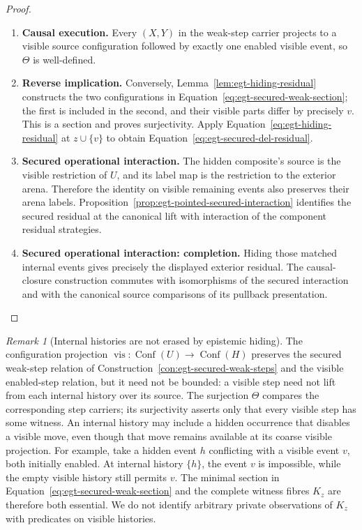 \documentclass[11pt,a4paper]{article}
\numberwithin{equation}{section}
\theoremstyle{definition}
\theoremstyle{remark}
\newtheorem{remark}[theorem]{Remark}
\theoremstyle{plain}
\begin{document}
\begin{proof}
\leavevmode
\begin{enumerate}[label=\textup{(\arabic*)},leftmargin=*,itemsep=4pt,topsep=3pt]
  \item \textbf{Causal execution.} Every $(X,Y)$ in the weak-step carrier projects to a visible source
configuration followed by exactly one enabled visible event, so $\Theta$
is well-defined.
  \item \textbf{Reverse implication.} Conversely, Lemma~\ref{lem:egt-hiding-residual}
constructs the two configurations in
Equation~\eqref{eq:egt-secured-weak-section}; the first is included in
the second, and their visible parts differ by precisely $v$. This is a
section and proves surjectivity. Apply
Equation~\eqref{eq:egt-hiding-residual} at $z\cup\{v\}$ to obtain
Equation~\eqref{eq:egt-secured-del-residual}.
  \item \textbf{Secured operational interaction.} The hidden composite's
source is the visible restriction of $U$, and its label map is the
restriction to the exterior arena. Therefore the identity on visible
remaining events also preserves their arena labels. Proposition~\ref{prop:egt-pointed-secured-interaction} identifies the
secured residual at the canonical lift with interaction of the
component residual strategies.
  \item \textbf{Secured operational interaction: completion.} Hiding those matched internal events
gives precisely the displayed exterior residual. The causal-closure
construction commutes with isomorphisms of the secured interaction and
with the canonical source comparisons of its pullback presentation.
\end{enumerate}
\end{proof}


\begin{remark}[Internal histories are not erased by epistemic hiding]
\label{rem:egt-hidden-epistemic-witnesses}
The configuration projection
$\operatorname{vis}:\operatorname{Conf}(U)\to\operatorname{Conf}(H)$
preserves the secured weak-step relation of
Construction~\ref{con:egt-secured-weak-steps} and the visible enabled-step
relation, but it need not be bounded: a visible step need not lift from
each internal history over its source. The surjection $\Theta$ compares
the corresponding step carriers; its surjectivity asserts only that every
visible step has some witness. An internal history may include a hidden
occurrence that disables a visible
move, even though that move remains available at its coarse visible
projection. For example, take a hidden event $h$ conflicting with a
visible event $v$, both initially enabled. At internal history $\{h\}$,
the event $v$ is impossible, while the empty visible history still permits
$v$. The minimal section in
Equation~\eqref{eq:egt-secured-weak-section} and the complete witness
fibres $K_z$ are therefore both essential. We do not identify arbitrary
private observations of $K_z$ with predicates on visible histories.
\end{remark}
\end{document}
